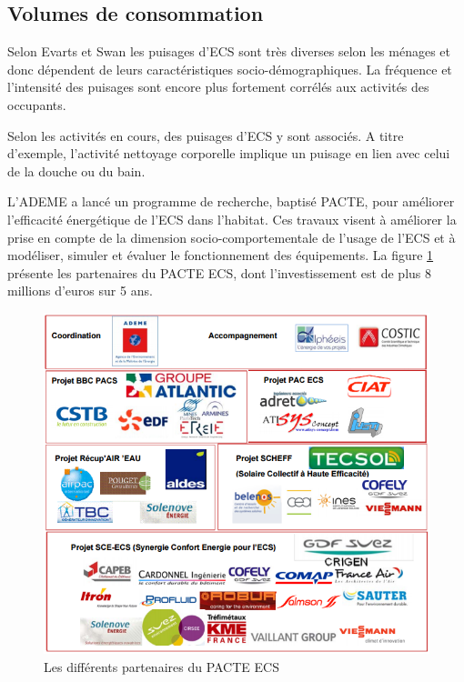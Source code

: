 \subsection{Volumes de consommation}

Selon Evarts et Swan \cite{Evarts-13} les puisages d'ECS sont très diverses selon les ménages et donc dépendent de leurs caractéristiques socio-démographiques. La fréquence et l'intensité des puisages sont encore plus fortement corrélés aux activités des occupants.

Selon les activités en cours, des puisages d'ECS y sont associés. A titre d'exemple, l'activité nettoyage corporelle implique un puisage en lien avec celui de la douche ou du bain.

L'ADEME a lancé un programme de recherche, baptisé PACTE, pour améliorer l'efficacité énergétique de l'ECS dans l'habitat. Ces travaux visent à améliorer la prise en compte de la dimension socio-comportementale de l'usage de l'ECS et à modéliser, simuler et évaluer le fonctionnement des équipements. La figure \ref{fig:PACTEECS} présente les partenaires du PACTE ECS, dont l'investissement est de plus 8 millions d'euros sur 5 ans.

\begin{figure}[h]
\centering
\includegraphics[scale=0.8]{Images/PACTEECS}
\caption{Les différents partenaires du PACTE ECS}
\label{fig:PACTEECS}
\end{figure}

